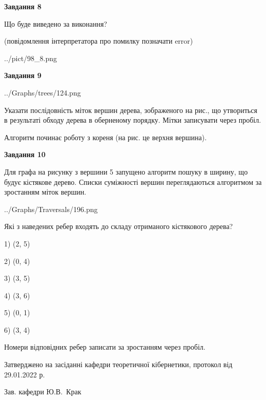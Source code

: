 \documentclass[12pt, ukrainian]{article}
\begin{document}
{\begin {large}
{\begin {center}\textbf{Завдання 8}\end {center}}\par
Що буде виведено за виконання?\par
 (повідомлення інтерпретатора про помилку позначати error)\par
\begin{center}
	{../pict/98_8.png}
\end{center}
\newpage

{\begin {center}\textbf{Завдання 9}\end {center}}\par

\begin{center}
	{../Graphs/trees/124.png}
\end{center}
Указати послідовність міток вершин дерева, зображеного на рис., що утвориться в результаті обходу дерева в оберненому порядку. Мітки записувати через пробіл.\par Алгоритм починає роботу з кореня (на рис. це верхня вершина).\par
\newpage

{\begin {center}\textbf{Завдання 10}\end {center}}\par
Для графа на рисунку з вершини 5 запущено алгоритм пошуку в ширину, що будує кістякове дерево. Списки суміжності вершин переглядаються алгоритмом за зростанням міток вершин.\par
\begin{center}
	{../Graphs/Traversals/196.png}
\end{center}
\par Які з наведених ребер входять до складу отриманого кістякового дерева?\par
1) (2, 5)\par
2) (0, 4)\par
3) (3, 5)\par
4) (3, 6)\par
5) (0, 1)\par
6) (3, 4)\par
{\vskip 15pt} Номери відповідних ребер записати за зростанням через пробіл.\par
\newpage


\end {large}
}
{\smallskip \begin {small} Затверджено на засіданні кафедри теоретичної кібернетики, протокол  від   29.01.2022 р.\par\smallskip\smallskip
{\parbox {6.5 cm}{Зав. кафедри \dotfill Ю.В.~Крак}} \end{small}}
\end{document}
